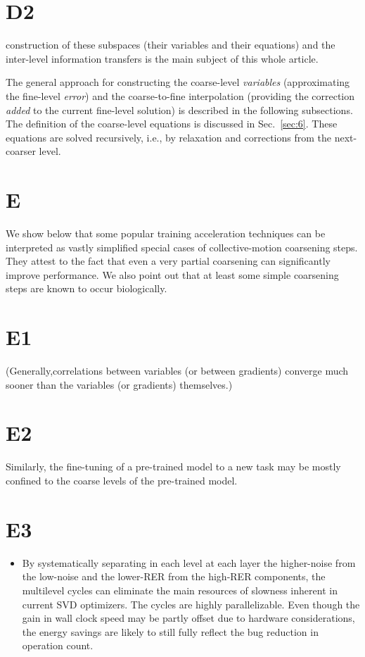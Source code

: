 \documentclass{article} %
\begin{document}
\section{D2}
construction of these subspaces (their variables and their equations) and the inter-level information transfers is the main subject of this whole article.

The general approach for constructing the coarse-level {\it variables} (approximating the fine-level {\it error}) and the coarse-to-fine interpolation (providing the correction {\it added} to the current fine-level solution) is described in the following subsections. The definition of the coarse-level equations is discussed in Sec.~\ref{sec:6}. These equations are solved recursively, i.e., by relaxation and corrections from the next-coarser level.

\section{E}
We show below that some popular training acceleration techniques can be interpreted as vastly simplified special cases of collective-motion coarsening steps. They attest to the fact that even a very partial coarsening can significantly improve performance. We also point out that at least some simple coarsening steps are known to occur biologically.

\section{E1}
(Generally,correlations between variables (or between gradients) converge much sooner than the variables (or gradients) themselves.)

\section{E2}
Similarly, the fine-tuning of a pre-trained model to a new task may be mostly confined to the coarse levels of the pre-trained model.

\section{E3}
\begin{itemize}
    \item By systematically separating in each level at each layer the higher-noise from the low-noise and the lower-RER from the high-RER components, the multilevel cycles can eliminate the main resources of slowness inherent in current SVD optimizers. The cycles are highly parallelizable. Even though the gain in wall clock speed may be partly offset due to hardware considerations, the energy savings are likely to still fully reflect the bug reduction in operation count.
\end{itemize}
\end{document}
